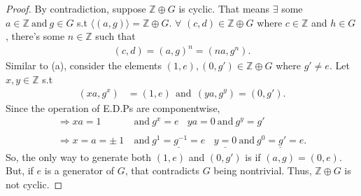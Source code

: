\documentclass[12pt, letterpaper]{article}
\begin{document}
 \begin{proof}
     By contradiction, suppose $\mathbb{Z} \oplus G$ is cyclic. That means $\exists$ some $a \in \mathbb{Z} \ \text{and} \ g \in G$ s.t $\langle (a,g)\rangle = \mathbb{Z}\oplus G$. $\forall$ $(c, d) \in \mathbb{Z}\oplus G$ where $c \in \mathbb{Z}$ and $h \in G$, there's some $n \in \mathbb{Z}$ such that 
     \begin{align*}
         (c, d) = (a,g)^n = (na, g^{n}).
     \end{align*} 
     Similar to (a), consider the elements $(1,e), (0, g') \in \mathbb{Z}\oplus G$ where $g' \neq e$. Let $x,y \in \mathbb{Z}$ s.t
     \begin{align*}
         (xa, g^{x}) &= (1, e) \ \ \text{and} \ \ (ya, g^{y}) = (0, g').
     \end{align*}
     Since the operation of E.D.Ps are componentwise,
     \begin{align*}
     \Rightarrow xa = 1 \ &\text{and} \ g^{x} = e \ \  \ \ ya  = 0 \ \text{and} \ g^{y} = g' \\ \\ 
     \Rightarrow x = a = \pm \ 1 \ &\text{and} \ \underline{g^1 = g^{-1} = e} \ \ \ \ \underline{y =  0} \ \text{and} \ \underline{g^0 =g' = e}. 
     \end{align*}
     So, the only way to generate both $(1,e)$ and $(0, g')$ is if $(a,g) = (0,e)$. But, if $e$ is a generator of $G$, that contradicts $G$ being nontrivial. Thus, $\mathbb{Z}\oplus G$ is not cyclic.
 \end{proof}
\end{document}
